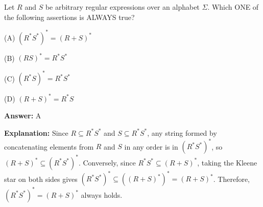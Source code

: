 \begin{tcolorbox}[enhanced,breakable,colback=boxgray,colframe=gray!45,boxrule=0.4pt,arc=2pt,left=6pt,right=6pt,top=4pt,bottom=4pt,title={Q.18},fonttitle=\bfseries\small,coltitle=black,colbacktitle=gray!15]
\small Let $R$ and $S$ be arbitrary regular expressions over an alphabet $\Sigma$. Which ONE of the following assertions is ALWAYS true?\par\par\hspace*{1em}(A) $(R^* S^*)^* = (R + S)^*$\par\hspace*{1em}(B) $(R S)^* = R^* S^*$\par\hspace*{1em}(C) $(R^* S)^* = R^* S^*$\par\hspace*{1em}(D) $(R + S)^* = R^* S$\par{}\par\smallskip\textbf{Answer:} A\par\par\textbf{Explanation:} Since $R \subseteq R^* S^*$ and $S \subseteq R^* S^*$, any string formed by concatenating elements from $R$ and $S$ in any order is in $(R^* S^*)^*$, so $(R + S)^* \subseteq (R^* S^*)^*$. Conversely, since $R^* S^* \subseteq (R + S)^*$, taking the Kleene star on both sides gives $(R^* S^*)^* \subseteq ((R + S)^*)^* = (R + S)^*$. Therefore, $(R^* S^*)^* = (R + S)^*$ always holds.\par
\end{tcolorbox}


